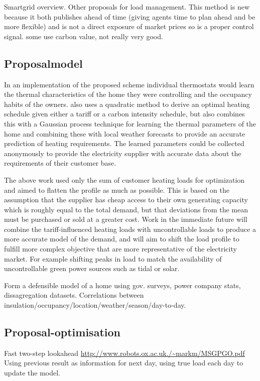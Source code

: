 \documentclass[a4paper, 10 pt, conference]{ieeeconf}  %
\begin{document}
Smartgrid overview. Other proposals for load management. This method is new because it both publishes ahead of time (giving agents time to plan ahead and be more flexible) and is not a direct exposure of market prices so is a proper control signal. some use carbon value, not really very good.

\subsection{Proposalmodel}
In an implementation of the proposed scheme individual thermostats would learn the thermal characteristics of the home they were controlling and the occupancy habits of the owners. \cite{rogers2011adaptive} also uses a quadratic method to derive an optimal heating schedule given either a tariff or a carbon intensity schedule, but also combines this with a Gaussian process technique for learning the thermal parameters of the home and combining these with local weather forecasts to provide an accurate prediction of heating requirements. The learned parameters could be collected anonymously to provide the electricity supplier with accurate data about the requirements of their customer base.

The above work used only the sum of customer heating loads for optimization and aimed to flatten the profile as much as possible. This is based on the assumption that the supplier has cheap access to their own generating capacity which is roughly equal to the total demand, but that deviations from the mean must be purchased or sold at a greater cost. Work in the immediate future will combine the tariff-influenced heating loads with uncontrollable loads to produce a more accurate model of the demand, and will aim to shift the load profile to fulfill more complex objective that are more representative of the electricity market. For example shifting peaks in load to match the availability of uncontrollable green power sources such as tidal or solar.

Form a defensible model of a home using gov. surveys, power company stats, dissagregation datasets. Correlations between insulation/occupancy/location/weather/season/day-to-day.
\subsection{Proposal-optimisation}
Fast two-step lookahead \url{http://www.robots.ox.ac.uk./~markm/MSGPGO.pdf}
Using previous result as information for next day, using true load each day to update the model.

\section*{}
\pagebreak
\singlespacing
\twocolumn



\end{document}
